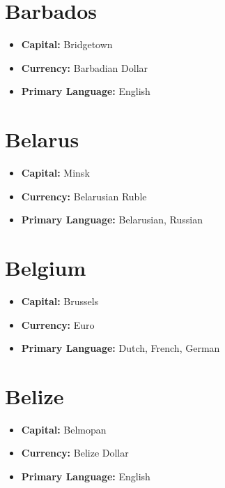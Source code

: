 \documentclass[a4paper,100pt,twoside]{book}
\begin{document}
\section*{\Huge Barbados}
\vspace{5mm} %
\begin{itemize}
	\item \textbf{Capital:} Bridgetown
	\item \textbf{Currency:} Barbadian Dollar
	\item \textbf{Primary Language:} English
\end{itemize}

\section*{\Huge Belarus}
\vspace{5mm} %
\begin{itemize}
	\item \textbf{Capital:} Minsk
	\item \textbf{Currency:} Belarusian Ruble
	\item \textbf{Primary Language:} Belarusian, Russian
\end{itemize}

\section*{\Huge Belgium}
\vspace{5mm} %
\begin{itemize}
	\item \textbf{Capital:} Brussels
	\item \textbf{Currency:} Euro
	\item \textbf{Primary Language:} Dutch, French, German
\end{itemize}

\section*{\Huge Belize}
\vspace{5mm} %
\begin{itemize}
	\item \textbf{Capital:} Belmopan
	\item \textbf{Currency:} Belize Dollar
	\item \textbf{Primary Language:} English
\end{itemize}
\end{document}
